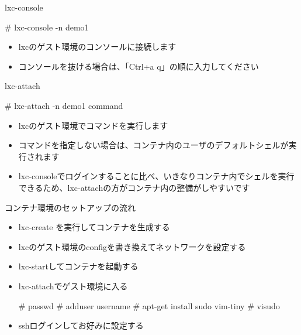 \begin{frame}[containsverbatim]{lxc-console}
  \begin{commandline}
  # lxc-console -n demo1
  \end{commandline}
  \begin{itemize}
  \item lxcのゲスト環境のコンソールに接続します
  \item コンソールを抜ける場合は、「Ctrl+a q」の順に入力してください
  \end{itemize}
\end{frame}

\begin{frame}[containsverbatim]{lxc-attach}
  \begin{commandline}
  # lxc-attach -n demo1 {command}
  \end{commandline}
  \begin{itemize}
  \item lxcのゲスト環境でコマンドを実行します
  \item コマンドを指定しない場合は、コンテナ内のユーザのデフォルトシェルが実行されます
  \item lxc-consoleでログインすることに比べ、いきなりコンテナ内でシェルを実行できるため、lxc-attachの方がコンテナ内の整備がしやすいです
  \end{itemize}
\end{frame}



\begin{frame}[containsverbatim]{コンテナ環境のセットアップの流れ}
  \begin{itemize}
  \item lxc-create を実行してコンテナを生成する
  \item lxcのゲスト環境のconfigを書き換えてネットワークを設定する
  \item lxc-startしてコンテナを起動する
  \item lxc-attachでゲスト環境に入る
  \begin{commandline}
  # passwd
  # adduser username
  # apt-get install sudo vim-tiny
  # visudo
  \end{commandline}
  \item sshログインしてお好みに設定する
  \end{itemize}
\end{frame}


